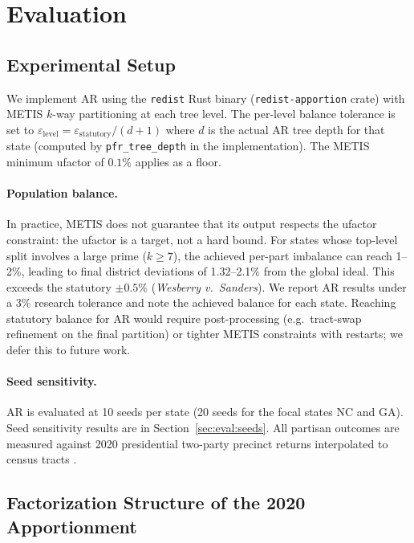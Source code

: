 \section{Evaluation}
\label{sec:evaluation}

\subsection{Experimental Setup}
\label{sec:eval:setup}

We implement AR using the \texttt{redist} Rust binary (\texttt{redist-apportion}
crate) with METIS $k$-way partitioning at each tree level. The per-level balance
tolerance is set to $\varepsilon_{\text{level}} = \varepsilon_{\text{statutory}} /
(d+1)$ where $d$ is the actual AR tree depth for that state (computed by
\texttt{pfr\_tree\_depth} in the implementation). The METIS minimum ufactor of
$0.1\%$ applies as a floor.

\paragraph{Population balance.}
In practice, METIS does not guarantee that its output respects the ufactor
constraint: the ufactor is a target, not a hard bound. For states whose
top-level split involves a large prime ($k \geq 7$), the achieved per-part
imbalance can reach 1--2\%, leading to final district deviations of 1.32--2.1\%
from the global ideal. This exceeds the statutory $\pm 0.5\%$
(\emph{Wesberry v.\ Sanders}). We report AR results under a $3\%$ research
tolerance and note the achieved balance for each state. Reaching statutory
balance for AR would require post-processing (e.g.\ tract-swap refinement on
the final partition) or tighter METIS constraints with restarts; we defer this
to future work.

\paragraph{Seed sensitivity.}
AR is evaluated at 10 seeds per state (20 seeds for the focal states NC and
GA). Seed sensitivity results are in Section~\ref{sec:eval:seeds}. All partisan
outcomes are measured against 2020 presidential two-party precinct returns
interpolated to census tracts \citep{Kuriwaki2023}.

\subsection{Factorization Structure of the 2020 Apportionment}
\label{sec:eval:factorizations}

